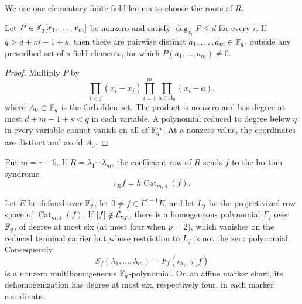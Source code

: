 We use one elementary finite-field lemma to choose the roots of \(R\).

\begin{lemma}
\label{lem:vandermonde-grid}%
%
Let \(P\in\mathbb F_q[x_1,\ldots,x_m]\) be nonzero and satisfy
\(\deg_{x_i}P\leq d\) for every \(i\).  If \(q>d+m-1+s\), then there are
pairwise distinct \(a_1,\ldots,a_m\in\mathbb F_q\), outside any prescribed set of
\(s\) field elements, for which \(P(a_1,\ldots,a_m)\ne0\).
\end{lemma}

\begin{proof}
Multiply \(P\) by
\[
 \prod_{i<j}(x_i-x_j)
 \prod_{i=1}^m\prod_{a\in A_0}(x_i-a),
\]
where \(A_0\subset\mathbb F_q\) is the forbidden set.  The product is nonzero and
has degree at most \(d+m-1+s<q\) in each variable.  A polynomial reduced to
degree below \(q\) in every variable cannot vanish on all of \(\mathbb F_q^m\).
At a nonzero value, the coordinates are distinct and avoid \(A_0\).
\end{proof}

Put \(m=r-5\).  If \(R=\lambda_1\cdots\lambda_m\), the coefficient row of
\(R\) sends \(f\) to the bottom syndrome
\[
 \iota_Rf=h\operatorname{Cat}_{m,4}(f).
\]

\begin{lemma}
\label{lem:terminal-selector}%
%
Let \(E\) be defined over \(\mathbb F_q\), let
\(0\ne f\in\Gamma^{r-1}E\), and let \(L_f\) be the projectivized row space
of \(\operatorname{Cat}_{m,4}(f)\).  If
\([f]\notin\mathcal E_{r,p}\), there is a homogeneous polynomial
\(F_f\) over \(\mathbb F_q\), of degree at most six (at most four when \(p=2\)),
which vanishes on the reduced terminal carrier but whose restriction to
\(L_f\) is not the zero polynomial.
Consequently
\[
 S_f(\lambda_1,\ldots,\lambda_m)
 =F_f(\iota_{\lambda_1\cdots\lambda_m}f)
\]
is a nonzero multihomogeneous \(\mathbb F_q\)-polynomial.  On an affine marker chart,
its dehomogenization has degree at most six, respectively four, in each marker
coordinate.
\end{lemma}

